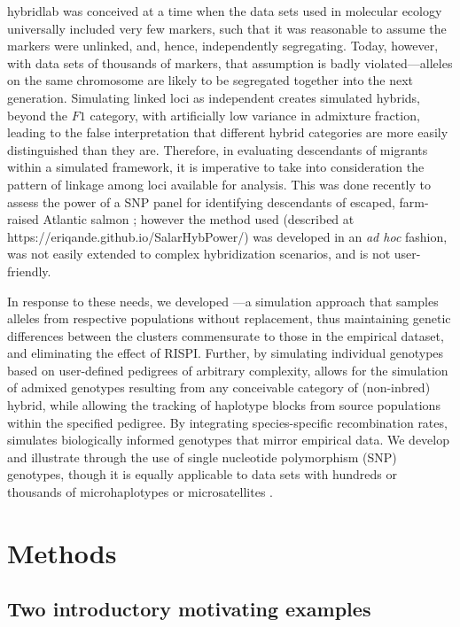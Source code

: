 {\sc hybridlab} was conceived at a time when
the data sets used in molecular ecology universally included very few markers, such that
it was reasonable to assume the markers were unlinked, and, hence, independently segregating.
Today, however, with data sets of thousands of markers, that assumption is badly violated---alleles
on the same chromosome are likely to be segregated together into the next generation.
Simulating linked loci as independent creates simulated hybrids, beyond the $F1$ category, with 
artificially low variance in admixture fraction, leading to the false interpretation that different
hybrid categories are more easily distinguished than they are. Therefore, in evaluating descendants of migrants within a simulated framework, it is imperative to take into consideration the pattern of
linkage among loci available for analysis. This was done recently to assess the power of a SNP panel for identifying descendants of escaped, farm-raised Atlantic salmon \citep{wringe2019development}; however the method used (described at https://eriqande.github.io/SalarHybPower/) was developed in an {\em ad hoc} fashion, was not easily extended to
complex hybridization scenarios, and is not user-friendly.

In response to these needs, we developed \gscramble{}---a simulation approach that samples alleles from respective populations without
replacement, thus maintaining genetic differences between the clusters commensurate to those in the empirical dataset, and eliminating the effect of RISPI.
Further, by simulating individual genotypes based on user-defined pedigrees of arbitrary complexity, \gscramble{} allows for the simulation of admixed genotypes resulting from any conceivable category of (non-inbred) hybrid, while allowing the tracking of haplotype blocks from source populations within the specified pedigree.
By integrating species-specific recombination rates, \gscramble{} simulates biologically informed genotypes that mirror empirical data.
We develop and illustrate \gscramble{} through the use of single nucleotide polymorphism (SNP) genotypes, though it is equally applicable to data sets with hundreds or thousands of
microhaplotypes \citep{baetscher2018microhaplotypes} or microsatellites
\citep{zhan2017megasat}.




\section*{Methods}

\subsection*{Two introductory motivating examples}


